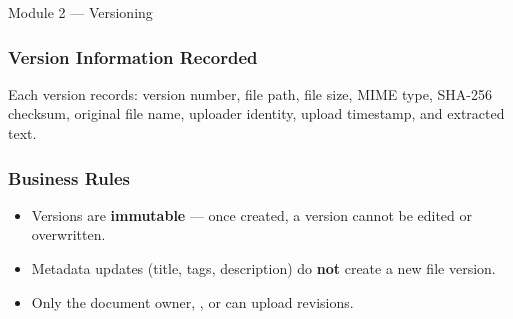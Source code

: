 \begin{ugModule}{Module 2 --- Versioning}
  \subsubsection*{Version Information Recorded}
  Each version records: version number, file path, file size,
  MIME type, SHA-256 checksum, original file name, uploader
  identity, upload timestamp, and extracted text.

  \subsubsection*{Business Rules}
  \begin{itemize}[leftmargin=18pt]
    \item Versions are \textbf{immutable} --- once created, a
          version cannot be edited or overwritten.
    \item Metadata updates (title, tags, description) do
          \textbf{not} create a new file version.
    \item Only the document owner, , or
           can upload revisions.
  \end{itemize}
\end{ugModule}

\vspace{10pt}

